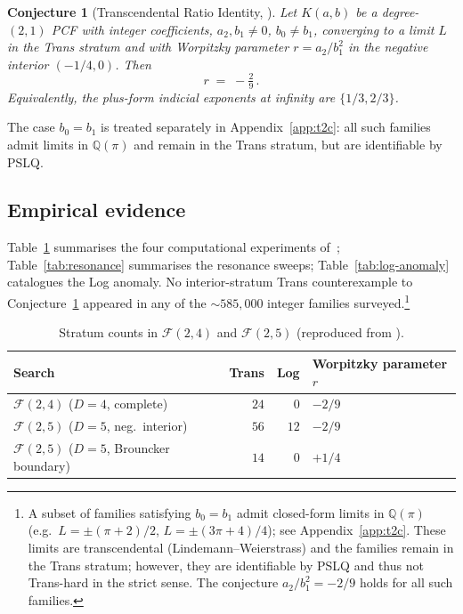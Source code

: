 \documentclass[11pt]{amsart}
\newtheorem{conjecture}[theorem]{Conjecture}
\theoremstyle{definition}
\theoremstyle{remark}
\newcommand{\FF}{\mathcal{F}}
\begin{document}
\begin{conjecture}[Transcendental Ratio Identity, \cite{TRINote}]
\label{conj:tri}
Let $K(a,b)$ be a degree-$(2,1)$ PCF with integer coefficients,
$a_2,b_1 \ne 0$, $b_0 \ne b_1$, converging to a limit $L$ in the
Trans stratum and with Worpitzky parameter $r = a_2/b_1^2$ in the
negative interior $(-1/4,0)$.  Then
\[
  r \;=\; -\tfrac{2}{9}\,.
\]
Equivalently, the plus-form indicial exponents at infinity are
$\{1/3,2/3\}$.
\end{conjecture}

The case $b_0 = b_1$ is treated separately in
Appendix~\ref{app:t2c}: all such families admit limits in
$\mathbb{Q}(\pi)$ and remain in the Trans stratum, but are
identifiable by PSLQ.

\subsection{Empirical evidence}\label{sec:evidence}

Table~\ref{tab:censuses} summarises the four computational
experiments of~\cite{TRINote}; Table~\ref{tab:resonance} summarises
the resonance sweeps; Table~\ref{tab:log-anomaly} catalogues the Log
anomaly.  No interior-stratum Trans counterexample to
Conjecture~\ref{conj:tri} appeared in any of the
$\sim\!585{,}000$ integer families surveyed.\footnote{A subset of
families satisfying $b_0 = b_1$ admit closed-form limits in
$\mathbb{Q}(\pi)$ (e.g.\ $L = \pm(\pi+2)/2$, $L = \pm(3\pi+4)/4$);
see Appendix~\ref{app:t2c}.  These limits are transcendental
(Lindemann--Weierstrass) and the families remain in the Trans
stratum; however, they are identifiable by PSLQ and thus not
Trans-hard in the strict sense.  The conjecture
$a_2/b_1^2 = -2/9$ holds for all such families.}

\begin{table}[t]
\centering
\caption{Stratum counts in $\FF(2,4)$ and $\FF(2,5)$
(reproduced from \cite{TRINote}).}
\label{tab:censuses}
\begin{tabular}{lrrl}
\toprule
Search & Trans & Log & Worpitzky parameter $r$ \\
\midrule
$\FF(2,4)$ ($D=4$, complete)
  & $24$ & $0$  & $-2/9$ \\
$\FF(2,5)$ ($D=5$, neg.\ interior)
  & $56$ & $12$ & $-2/9$ \\
$\FF(2,5)$ ($D=5$, Brouncker boundary)
  & $14$ & $0$  & $+1/4$ \\
\bottomrule
\end{tabular}
\end{table}
\end{document}
